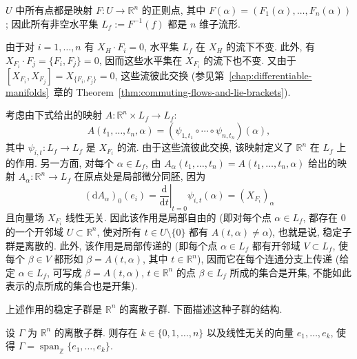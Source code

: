 \begin{RiemannProof}
$U$ 中所有点都是映射 $F:U\to\mathbb{R}^n$ 的正则点, 其中 $F(\alpha)=(F_1(\alpha),\ldots,F_n(\alpha))$; 因此所有非空水平集 $L_f:=F^{-1}(f)$ 都是 $n$ 维子流形.

由于对 $i=1,\ldots,n$ 有 $X_H\cdot F_i=0$, 水平集 $L_f$ 在 $X_H$ 的流下不变. 此外, 有 $X_{F_i}\cdot F_j=\{F_i,F_j\}=0$, 因而这些水平集在 $X_{F_i}$ 的流下也不变. 又由于 $[X_{F_i},X_{F_j}]=X_{\{F_i,F_j\}}=0$, 这些流彼此交换 (参见第~\ref{chap:differentiable-manifolds}~章的 Theorem~\ref{thm:commuting-flows-and-lie-brackets}).

考虑由下式给出的映射 $A:\mathbb{R}^n\times L_f\to L_f$:
\[
  A(t_1,\ldots,t_n,\alpha)=(\psi_{1,t_1}\circ\cdots\circ\psi_{n,t_n})(\alpha),
\]
其中 $\psi_{i,t}:L_f\to L_f$ 是 $X_{F_i}$ 的流. 由于这些流彼此交换, 该映射定义了 $\mathbb{R}^n$ 在 $L_f$ 上的作用. 另一方面, 对每个 $\alpha\in L_f$, 由 $A_\alpha(t_1,\ldots,t_n)=A(t_1,\ldots,t_n,\alpha)$ 给出的映射 $A_\alpha:\mathbb{R}^n\to L_f$ 在原点处是局部微分同胚, 因为
\[
  (\mathrm{d}A_\alpha)_0(e_i)=\left.\frac{\mathrm{d}}{\mathrm{d}t}\right|_{t=0}
    \psi_{i,t}(\alpha)=(X_{F_i})_\alpha
\]
且向量场 $X_{F_i}$ 线性无关. 因此该作用是局部自由的 (即对每个点 $\alpha\in L_f$, 都存在 $0$ 的一个开邻域 $U\subset\mathbb{R}^n$, 使对所有 $t\in U\setminus\{0\}$ 都有 $A(t,\alpha)\ne\alpha$), 也就是说, 稳定子群是离散的. 此外, 该作用是局部传递的 (即每个点 $\alpha\in L_f$ 都有开邻域 $V\subset L_f$, 使每个 $\beta\in V$ 都形如 $\beta=A(t,\alpha)$, 其中 $t\in\mathbb{R}^n$), 因而它在每个连通分支上传递 (给定 $\alpha\in L_f$, 可写成 $\beta=A(t,\alpha)$, $t\in\mathbb{R}^n$ 的点 $\beta\in L_f$ 所成的集合是开集, 不能如此表示的点所成的集合也是开集).
\end{RiemannProof}

上述作用的稳定子群是 $\mathbb{R}^n$ 的离散子群. 下面描述这种子群的结构.

\begin{RiemannProposition}\label{prop:discrete-subgroups-of-euclidean-space}
设 $\Gamma$ 为 $\mathbb{R}^n$ 的离散子群. 则存在 $k\in\{0,1,\ldots,n\}$ 以及线性无关的向量 $e_1,\ldots,e_k$, 使得 $\Gamma=\operatorname{span}_{\mathbb{Z}}\{e_1,\ldots,e_k\}$.
\end{RiemannProposition}

